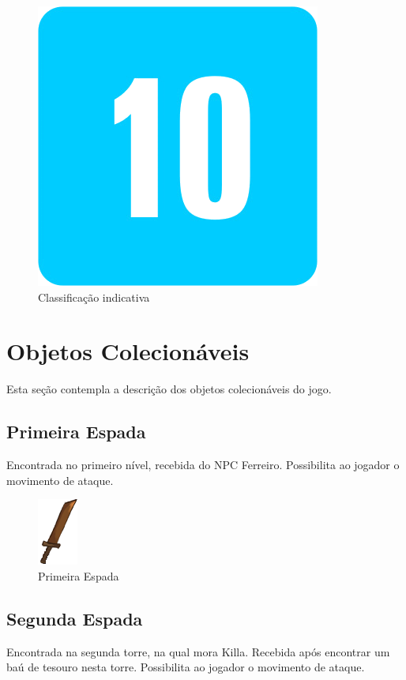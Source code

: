 \documentclass[12pt]{article}
\begin{document}
\begin{figure}[!htp]
    \centering
    \includegraphics[scale=0.3]{faixa_etaria.png}
    \caption{Classificação indicativa}
    \label{fig:faixa_indicativa}
\end{figure}

\newpage
\section{Objetos Colecionáveis}
Esta seção contempla a descrição dos objetos colecionáveis do jogo.

\subsection{Primeira Espada}
Encontrada no primeiro nível, recebida do NPC Ferreiro. Possibilita ao jogador
o movimento de ataque.

\begin{figure}[!htb]
    \centering
    \includegraphics[scale=0.5]{sword1.png}
    \caption{Primeira Espada}
    \label{fig:primeira_espada}
\end{figure}

\subsection{Segunda Espada}
Encontrada na segunda torre, na qual mora Killa. Recebida após encontrar
um baú de tesouro nesta torre. Possibilita ao jogador o movimento de ataque.
\end{document}

